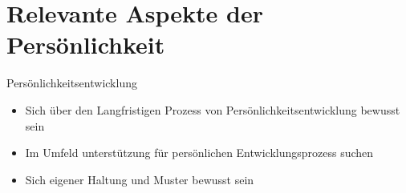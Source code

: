 \section{Relevante Aspekte der Persönlichkeit}

\begin{frame}[c]{Persönlichkeitsentwicklung}
    \begin{itemize}
    \item Sich über den Langfristigen Prozess von Persönlichkeitsentwicklung bewusst sein \newline
    \pause
    \item Im Umfeld unterstützung für persönlichen Entwicklungsprozess suchen \newline
    \pause
    \item Sich eigener Haltung und Muster bewusst sein
    \end{itemize}
\end{frame}
























